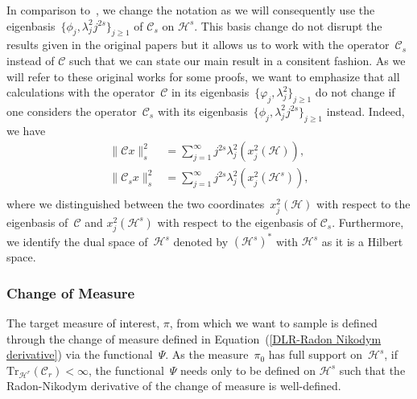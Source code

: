 \begin{rem}
  \label{DLR-Remark Change of basis}
  In comparison to~\autocite{Mattingly2010, Pillai2012}, we change the notation as we will consequently use the eigenbasis~$\{ \phi_j,  \lambda_j^2 j^{2s} \}_{j \geq 1}$ of $\mathcal{C}_s$ on $\mathcal{H}^s$. This basis change do not disrupt the results given in the original papers but it allows us to work with the operator~$\mathcal{C}_s$ instead of $\mathcal{C}$ such that we can state our main result in a consitent fashion. As we will refer to these original works for some  proofs, we want to emphasize that all calculations with the operator~$\mathcal{C}$ in its eigenbasis~$\{ \varphi_j,  \lambda_j^2 \}_{j \geq 1}$ do not change if one considers the operator~$\mathcal{C}_s$ with its eigenbasis~$\{ \phi_j,  \lambda_j^2 j^{2s} \}_{j \geq 1}$ instead. Indeed, we have
  \begin{equation}
    \begin{split}
      \| \mathcal{C}x \|_s^2 & = \sum_{j=1}^{\infty} j^{2s} \lambda_j^2 \left(x_j^2 (\mathcal{H})\right), \\
       \| \mathcal{C}_sx \|_s^2 & = \sum_{j=1}^{\infty} j^{2s} \lambda_j^2 \left(x_j^2(\mathcal{H}^s)\right),\\
    \end{split}
  \end{equation}
 where we distinguished between the two coordinates~$x_j^2 (\mathcal{H}) $ with respect to the eigenbasis of~$\mathcal{C}$ and $x_j^2(\mathcal{H}^s)$ with respect to the eigenbasis of $\mathcal{C}_s$. Furthermore, we identify the dual space of~$\mathcal{H}^s$ denoted by $(\mathcal{H}^s)^*$ with $\mathcal{H}^s$ as it is a Hilbert space.
\end{rem}




\subsubsection{Change of Measure}

The target measure of interest, $\pi$, from which we want to sample is defined through the change of measure defined in Equation~(\ref{DLR-Radon Nikodym derivative}) via the functional~$\Psi$. As the measure~$\pi_0$ has full support on~$\mathcal{H}^s$, if $\text{Tr}_{\mathcal{H}^r}(\mathcal{C}_r) < \infty$, the functional~$\Psi$ needs only to be defined on $\mathcal{H}^s$ such that the Radon-Nikodym derivative of the change of measure is well-defined.

